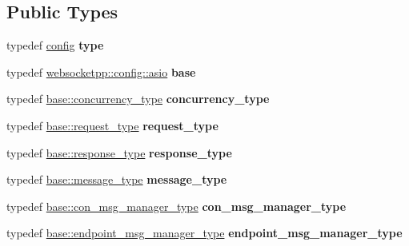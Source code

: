 \subsection*{Public Types}
\begin{DoxyCompactItemize}
\item 
\mbox{\label{structconfig__tls_a182bf35d72859e8ac56a47d25186694e}} 
typedef \mbox{\hyperlink{classconfig}{config}} {\bfseries type}
\item 
\mbox{\label{structconfig__tls_a74e0ce265ec2603aacff8cb97b650432}} 
typedef \mbox{\hyperlink{structwebsocketpp_1_1config_1_1asio}{websocketpp\+::config\+::asio}} {\bfseries base}
\item 
\mbox{\label{structconfig__tls_a0cd02433cc4d0e0c5a1496d29f2f23df}} 
typedef \mbox{\hyperlink{classwebsocketpp_1_1concurrency_1_1basic}{base\+::concurrency\+\_\+type}} {\bfseries concurrency\+\_\+type}
\item 
\mbox{\label{structconfig__tls_a5207e17a23de0825f76ed3e18e8f6cb8}} 
typedef \mbox{\hyperlink{classwebsocketpp_1_1http_1_1parser_1_1request}{base\+::request\+\_\+type}} {\bfseries request\+\_\+type}
\item 
\mbox{\label{structconfig__tls_aed8a4913e19cc2d0467a751544f1dab7}} 
typedef \mbox{\hyperlink{classwebsocketpp_1_1http_1_1parser_1_1response}{base\+::response\+\_\+type}} {\bfseries response\+\_\+type}
\item 
\mbox{\label{structconfig__tls_ab09426b1f992ecad5c63d0b871789482}} 
typedef \mbox{\hyperlink{classwebsocketpp_1_1message__buffer_1_1message}{base\+::message\+\_\+type}} {\bfseries message\+\_\+type}
\item 
\mbox{\label{structconfig__tls_a8bd0cd17282c4c37e5ad988cebdc5a8c}} 
typedef \mbox{\hyperlink{classwebsocketpp_1_1message__buffer_1_1alloc_1_1con__msg__manager}{base\+::con\+\_\+msg\+\_\+manager\+\_\+type}} {\bfseries con\+\_\+msg\+\_\+manager\+\_\+type}
\item 
\mbox{\label{structconfig__tls_a42d7bc91cc851bcd83472b4078362b78}} 
typedef \mbox{\hyperlink{classwebsocketpp_1_1message__buffer_1_1alloc_1_1endpoint__msg__manager}{base\+::endpoint\+\_\+msg\+\_\+manager\+\_\+type}} {\bfseries endpoint\+\_\+msg\+\_\+manager\+\_\+type}

\end{DoxyCompactItemize}
